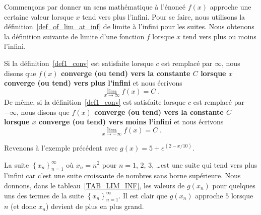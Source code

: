 {

Commençons par donner un sens mathématique à l'énoncé \lgm $f(x)$
approche une certaine valeur lorsque $x$ tend vers plus l'infini\rgm.
Pour se faire, nous utilisons la définition~\ref{def_of_lim_at_inf} de
limite à l'infini pour les suites.  Nous obtenons la définition suivante
de limite d'une fonction $f$ lorsque $x$ tend vers plus ou moins
l'infini.

\begin{defn} 
Si la définition~\ref{def1_conv} est satisfaite lorsque $c$ est
remplacé par $\infty$, nous disons que {\bfseries $f(x)$ converge (ou tend)
vers la constante $C$ lorsque $x$ converge (ou tend) vers plus
l'infini} et nous écrivons
\[
\lim_{x\rightarrow \infty} f(x) = C \; .
\]
De même, si la définition~\ref{def1_conv} est satisfaite lorsque $c$
est remplacé par $-\infty$, nous disons que {\bfseries $f(x)$ converge (ou
tend) vers la constante $C$ lorsque $x$ converge (ou tend) vers moins
l'infini} et nous écrivons
\[
\lim_{x\rightarrow -\infty} f(x) = C \; .
\]
\label{def_of_lim_of_f_at_inf}
\end{defn}

\begin{egg}
Revenons à l'exemple précédent avec
$\displaystyle g(x) = 5 + e^{\left(2 - x/10\right)}$.

La suite $\displaystyle \left\{ x_n \right\}_{n=1}^\infty$ où
$x_n = n^2$ pour $n=1$, $2$, $3$, \ldots est une suite qui tend vers
plus l'infini car c'est une suite croissante de nombres sans borne
supérieure.  Nous donnons, dans le tableau~\ref{TAB_LIM_INF}, les valeurs
de $g(x_n)$ pour quelques uns des termes de la suite
$\displaystyle \left\{ x_n\right\}_{n=1}^\infty$.  Il est clair que
$g(x_n)$ approche $5$ lorsque $n$ (et donc $x_n$) devient de plus en
plus grand.


\end{egg}}
